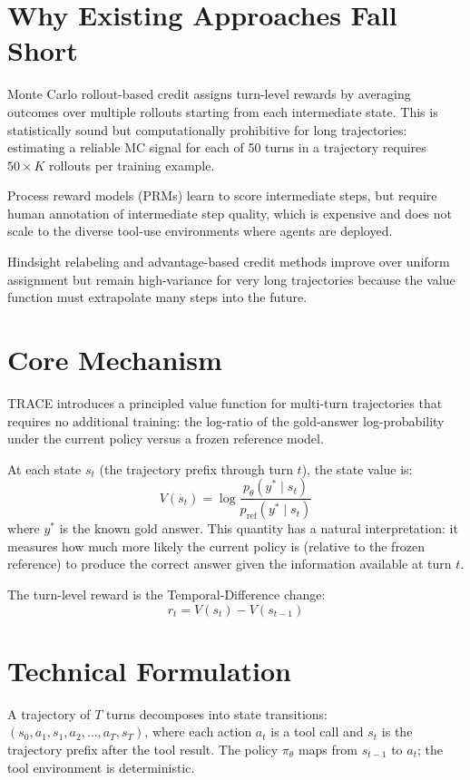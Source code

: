 \documentclass[10pt,twocolumn]{article}
\begin{document}
\section{Why Existing Approaches Fall Short}

Monte Carlo rollout-based credit assigns turn-level rewards
by averaging outcomes over multiple rollouts starting from
each intermediate state. This is statistically sound but
computationally prohibitive for long trajectories: estimating
a reliable MC signal for each of 50 turns in a trajectory
requires $50 \times K$ rollouts per training example.

Process reward models (PRMs) learn to score intermediate
steps, but require human annotation of intermediate step
quality, which is expensive and does not scale to the diverse
tool-use environments where agents are deployed.

Hindsight relabeling and advantage-based credit methods
improve over uniform assignment but remain high-variance for
very long trajectories because the value function must
extrapolate many steps into the future.

\section{Core Mechanism}

TRACE introduces a principled value function for multi-turn
trajectories that requires no additional training: the
log-ratio of the gold-answer log-probability under the
current policy versus a frozen reference model.

At each state $s_t$ (the trajectory prefix through turn $t$),
the state value is:
\[
V(s_t) = \log \frac{p_\theta(y^* \mid s_t)}{p_{\text{ref}}(y^* \mid s_t)}
\]
where $y^*$ is the known gold answer. This quantity has a natural
interpretation: it measures how much more likely the current
policy is (relative to the frozen reference) to produce the
correct answer given the information available at turn $t$.

The turn-level reward is the Temporal-Difference change:
\[
r_t = V(s_t) - V(s_{t-1})
\]

\section{Technical Formulation}

A trajectory of $T$ turns decomposes into state transitions:
$(s_0, a_1, s_1, a_2, \ldots, a_T, s_T)$, where each action $a_t$
is a tool call and $s_t$ is the trajectory prefix after the tool
result. The policy $\pi_\theta$ maps from $s_{t-1}$ to $a_t$; the
tool environment is deterministic.
\end{document}
